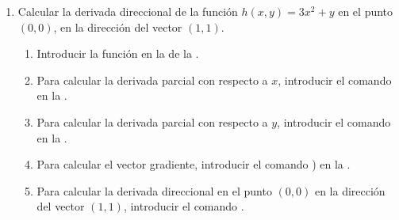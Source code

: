 \begin{enumerate}[leftmargin=*]

\item Calcular la derivada direccional de la función $h(x,y)= 3x^2+y$ en el punto $(0,0)$, en la dirección del vector $(1,1)$.
      \begin{indication}
      \begin{enumerate}
      \item Introducir la función  en la  de la .
      \item Para calcular la derivada parcial con respecto a $x$, introducir el comando  en la .
      \item Para calcular la derivada parcial con respecto a $y$, introducir el comando  en la .
      \item Para calcular el vector gradiente, introducir el comando ) en la .
      \item Para calcular la derivada direccional en el punto $(0,0)$ en la dirección del vector $(1,1)$, introducir el comando .
      \end{enumerate}
      \end{indication}


\end{enumerate}
